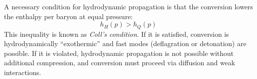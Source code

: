 \documentclass[superscriptaddress,amsmath,floatfix,aps,prc,twocolumn]{revtex4-1}
\begin{document}
A necessary condition for hydrodynamic propagation is that the conversion lowers the
enthalpy per baryon at equal pressure:
\begin{equation}
\boxed{
h_H(p) > h_Q(p)
}
\end{equation}
This inequality is known as \emph{Coll's condition}.
If it is satisfied, conversion is hydrodynamically ``exothermic'' and fast modes
(deflagration or detonation) are possible.
If it is violated, hydrodynamic propagation is not possible without additional
compression, and conversion must proceed via diffusion and weak interactions.



\appendix




\end{document}
